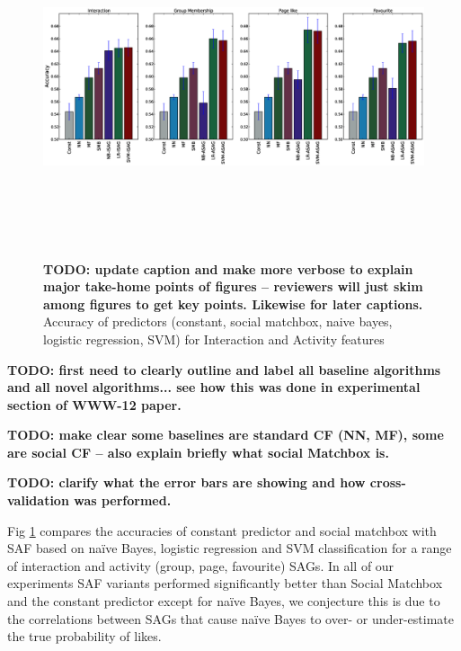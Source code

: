 \begin{figure}[tbp!]
\hspace{-6mm}\includegraphics[width=190mm, height=100mm]{data/plots/accuracy/accuracyLargeNew.eps}
\caption{ {\bf TODO: update caption and make more verbose to explain major take-home points of figures -- reviewers will just skim among figures to get key points.  Likewise for later captions.}  Accuracy of predictors (constant, social matchbox, naive bayes, logistic regression, SVM) for Interaction and Activity  features }
\label{Fig1}
\end{figure}

{\bf TODO: first need to clearly outline and label all baseline algorithms
           and all novel algorithms... see how this was done in experimental
           section of WWW-12 paper.}

{\bf TODO: make clear some baselines are standard CF (NN, MF), some are social CF -- also explain
           briefly what social Matchbox is.}

{\bf TODO: clarify what the error bars are showing and how
           cross-validation was performed.}

Fig \ref{Fig1} compares the accuracies of constant predictor and
social matchbox with SAF based on na\"{i}ve Bayes, logistic regression
and SVM classification for a range of interaction and activity (group,
page, favourite) SAGs.  In all of our experiments SAF variants
performed significantly better than Social Matchbox and the constant
predictor except for na\"{i}ve Bayes, we conjecture this is due to the
correlations between SAGs that cause na\"{i}ve Bayes to over- or
under-estimate the true probability of likes.

